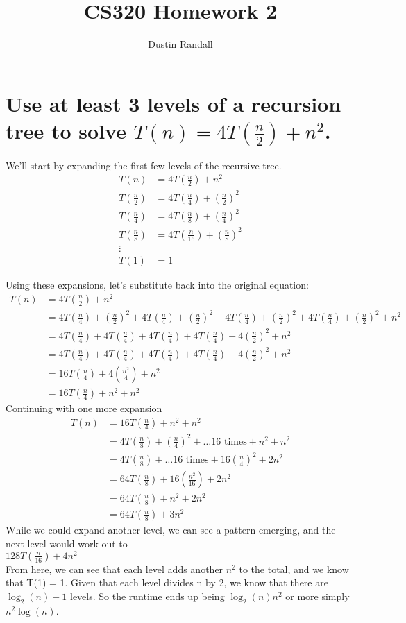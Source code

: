 \documentclass{article}
\begin{document}
\title{CS320 Homework 2}
\author{Dustin Randall}
\maketitle

\section{Use at least 3 levels of a recursion tree to solve \(T(n) = 4T(\frac{n}{2}) + n^2\).}
We'll start by expanding the first few levels of the recursive tree.
\begin{align*}
    T(n) &= 4T(\frac{n}{2}) + n^2 \\
    T(\frac{n}{2}) &= 4T(\frac{n}{4}) + (\frac{n}{2})^2 \\
    T(\frac{n}{4}) &= 4T(\frac{n}{8}) + (\frac{n}{4})^2 \\
    T(\frac{n}{8}) &= 4T(\frac{n}{16}) + (\frac{n}{8})^2 \\
    \vdots \\
    T(1) &= 1
\end{align*}

Using these expansions, let's substitute back into the original equation:
\begin{align*}
    T(n) &= 4T(\frac{n}{2}) + n^2 \\
         &= 4T(\frac{n}{4}) + (\frac{n}{2})^2 + 4T(\frac{n}{4}) + (\frac{n}{2})^2 + 4T(\frac{n}{4}) + (\frac{n}{2})^2 + 4T(\frac{n}{4}) + (\frac{n}{2})^2 + n^2 \\
         &= 4T(\frac{n}{4}) + 4T(\frac{n}{4}) + 4T(\frac{n}{4}) + 4T(\frac{n}{4}) + 4(\frac{n}{2})^2 + n^2 \\
         &= 4T(\frac{n}{4}) + 4T(\frac{n}{4}) + 4T(\frac{n}{4}) + 4T(\frac{n}{4}) + 4(\frac{n}{2})^2 + n^2 \\
         &= 16T(\frac{n}{4}) + 4(\frac{n^2}{4}) + n^2 \\
         &= 16T(\frac{n}{4}) + n^2 + n^2
\end{align*}
Continuing with one more expansion
\begin{align*}
    T(n) &= 16T(\frac{n}{4}) + n^2 + n^2 \\
         &= 4T(\frac{n}{8}) + (\frac{n}{4})^2 + \dots \text{16 times} + n^2 + n^2 \\
         &= 4T(\frac{n}{8}) + \dots \text{16 times} + 16(\frac{n}{4})^2 + 2n^2 \\
         &= 64T(\frac{n}{8}) + 16(\frac{n^2}{16}) + 2n^2 \\
         &= 64T(\frac{n}{8}) + n^2 + 2n^2 \\
         &= 64T(\frac{n}{8}) + 3n^2
\end{align*}
While we could expand another level, we can see a pattern emerging, and the next level would work out to \\
\(128T(\frac{n}{16}) + 4n^2\) \\
From here, we can see that each level adds another \(n^2\) to the total, and we know that T(1) = 1.
Given that each level divides n by 2, we know that there are \(\log_2(n) + 1\) levels.
So the runtime ends up being \(\log_2(n)n^2\) or more simply \(n^2 \log(n)\).
\end{document}
